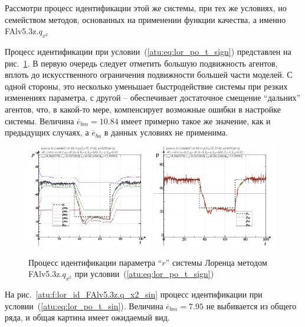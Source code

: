 Рассмотри процесс идентификации этой же системы, при тех же условиях,
но семейством методов, основанных на применении функции качества,
а именно FAlv5.3z.$q_{x^2}$

Процесс идентификации при условии~(\ref{atu:eq:lor_po_t_sign})
представлен на рис.~\ref{atu:f:lor_id_FAlv5.3z.q_x2_sign}.
В первую очередь следует отметить большую подвижность
агентов, вплоть до искусственного ограничения подвижности
большей части моделей. С одной стороны, это несколько уменьшает
быстродействие системы при резких изменениях параметра,
с другой -- обеспечивает достаточное смещение ``дальних'' агентов,
что, в какой-то мере, компенсирует возможные ошибки в настройке системы.
Величина $\overline{e}_{bm}=10.84$ имеет примерно такое же значение,
как и предыдущих случаях,
а $\overline{e}_{ba}$ в данных условиях не применима.

\begin{figure}[h!]
  \centerline{
    \includegraphics[width=0.49\textwidth]{p/cha/lor/FAlv5.3z/lor_FAlv5_3z_qx2-pl_n_sign.png}
    \hfill
    \includegraphics[width=0.49\textwidth]{p/cha/lor/FAlv5.3z/lor_FAlv5_3z_qx2-p_p_sign.png}
  }
  \caption{Процесс идентификации параметра ``$r$'' системы Лоренца методом FAlv5.3z.$q_{x^2}$ при условии~(\ref{atu:eq:lor_po_t_sign})}
  \label{atu:f:lor_id_FAlv5.3z.q_x2_sign}
\end{figure}

На рис.~\ref{atu:f:lor_id_FAlv5.3z.q_x2_sin}
процесс идентификации при условии~(\ref{atu:eq:lor_po_t_sin}).
Величина $\overline{e}_{bm}=7.95$ не выбивается из общего ряда,
и общая картина имеет ожидаемый вид.

